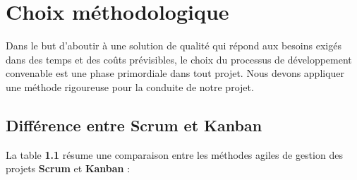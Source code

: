 \section{Choix méthodologique}
\par Dans le but d'aboutir à une solution de qualité qui répond aux besoins exigés dans des
temps et des coûts prévisibles, le choix du processus de développement convenable est
une phase primordiale dans tout projet. Nous devons appliquer une méthode rigoureuse
pour la conduite de notre projet.
\subsection{Différence entre Scrum et Kanban}
\par La table \textbf{1.1} résume une comparaison entre les méthodes agiles de gestion des projets \textbf{Scrum} et \textbf{Kanban} :
